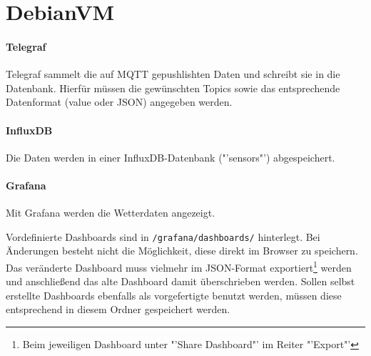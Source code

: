 \section{DebianVM}
\paragraph{Telegraf}
Telegraf sammelt die auf MQTT gepushlishten Daten und schreibt sie in die Datenbank. Hierfür müssen die gewünschten Topics sowie das entsprechende Datenformat (value oder JSON) angegeben werden. 

\paragraph{InfluxDB}
Die Daten werden in einer InfluxDB-Datenbank ("'sensors"') abgespeichert.

\paragraph{Grafana}
Mit Grafana werden die Wetterdaten angezeigt. 

Vordefinierte Dashboards sind in \verb|/grafana/dashboards/| hinterlegt. Bei Änderungen besteht nicht die Möglichkeit, diese direkt im Browser zu speichern. Das veränderte Dashboard muss vielmehr im JSON-Format exportiert\footnote{Beim jeweiligen Dashboard unter "'Share Dashboard"' im Reiter "'Export"'} werden und anschließend das alte Dashboard damit überschrieben werden. 
Sollen selbst erstellte Dashboards ebenfalls als vorgefertigte benutzt werden, müssen diese entsprechend in diesem Ordner gespeichert werden.


